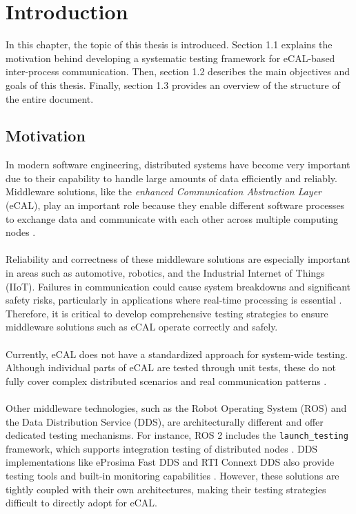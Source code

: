 \clearpage

\section{Introduction}

In this chapter, the topic of this thesis is introduced. Section 1.1 explains the motivation behind developing a systematic testing framework for eCAL-based inter-process communication. Then, section 1.2 describes the main objectives and goals of this thesis. Finally, section 1.3 provides an overview of the structure of the entire document.

\subsection{Motivation}

In modern software engineering, distributed systems have become very important due to their capability to handle large amounts of data efficiently and reliably. Middleware solutions, like the \textit{enhanced Communication Abstraction Layer} (eCAL), play an important role because they enable different software processes to exchange data and communicate with each other across multiple computing nodes \cite{ecal_github}.
\\
\\
Reliability and correctness of these middleware solutions are especially important in areas such as automotive, robotics, and the Industrial Internet of Things (IIoT). Failures in communication could cause system breakdowns and significant safety risks, particularly in applications where real-time processing is essential \cite{coulouris2012}. Therefore, it is critical to develop comprehensive testing strategies to ensure middleware solutions such as eCAL operate correctly and safely.
\\
\\
Currently, eCAL does not have a standardized approach for system-wide testing. Although individual parts of eCAL are tested through unit tests, these do not fully cover complex distributed scenarios and real communication patterns \cite{ecal_github}.
\\
\\
Other middleware technologies, such as the Robot Operating System (ROS) and the Data Distribution Service (DDS), are architecturally different and offer dedicated testing mechanisms. For instance, ROS 2 includes the \newline \texttt{launch\_testing} framework, which supports integration testing of distributed nodes \cite{ros2_launch_testing}. DDS implementations like eProsima Fast DDS and RTI Connext DDS also provide testing tools and built-in monitoring capabilities \cite{eprosima_fast_dds, rti_connext_dds}. However, these solutions are tightly coupled with their own architectures, making their testing strategies difficult to directly adopt for eCAL.

